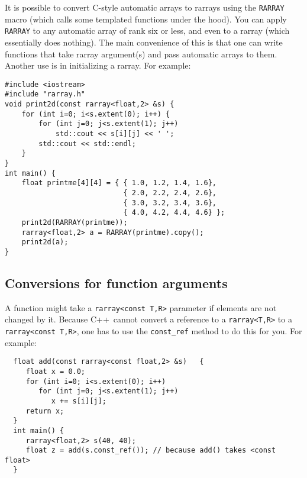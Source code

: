 \documentclass[11pt,twoside]{article}
\newcommand{\cxx}{C{++}}
\begin{document}
It is possible to convert C-style automatic arrays to rarrays using the {\tt RARRAY} macro (which calls some templated functions under the hood).  You can apply {\tt RARRAY} to any automatic array of rank six or less, and even to a rarray (which essentially does nothing). 
The main convenience of this is that one can write functions that take rarray argument(s) and pass automatic arrays to them. Another use is in initializing a rarray. For example:
\vspace{-5pt}\begin{framed}\vspace{-14pt}%
\begin{verbatim}
#include <iostream>
#include "rarray.h"
void print2d(const rarray<float,2> &s) {
    for (int i=0; i<s.extent(0); i++) {
        for (int j=0; j<s.extent(1); j++)
            std::cout << s[i][j] << ' ';
        std::cout << std::endl;
    }
}
int main() {
    float printme[4][4] = { { 1.0, 1.2, 1.4, 1.6},
                            { 2.0, 2.2, 2.4, 2.6},
                            { 3.0, 3.2, 3.4, 3.6},
                            { 4.0, 4.2, 4.4, 4.6} };
    print2d(RARRAY(printme));
    rarray<float,2> a = RARRAY(printme).copy();
    print2d(a);
}
\end{verbatim}%
\vspace{-14pt}\end{framed}\vspace{-8pt}



\subsection{Conversions for function arguments}

A function might take a \texttt{rarray{\tt<}const T,R{\tt>}} parameter if elements are not changed by it. Because \cxx\ cannot convert a reference to a \texttt{rarray{\tt<}T,R{\tt>}} to a \texttt{rarray{\tt<}const T,R{\tt>}}, one has to use the \texttt{const\_ref} method to do this for you.
For example:
\vspace{-5pt}\begin{framed}\vspace{-14pt}%
\begin{verbatim}
  float add(const rarray<const float,2> &s)   {
     float x = 0.0;
     for (int i=0; i<s.extent(0); i++)
        for (int j=0; j<s.extent(1); j++)
           x += s[i][j];
     return x;
  }
  int main() {
     rarray<float,2> s(40, 40);
     float z = add(s.const_ref()); // because add() takes <const float>
  }
\end{verbatim}%
\vspace{-14pt}
\end{framed}\vspace{-8pt}
\end{document}
